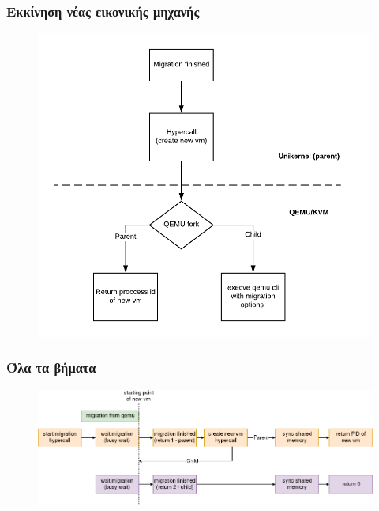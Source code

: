\documentclass[red,slidestop,notes,compress,mathserif]{beamer}
\begin{document}
\begin{frame}
\frametitle{Εκκίνηση νέας εικονικής μηχανής}
\begin{figure}
\center
\includegraphics[scale=0.57]{figures/fork_stage2.png}
\end{figure}
\end{frame}


\begin{frame}
\frametitle{Όλα τα βήματα}
\begin{figure}
\center
\includegraphics[scale=0.36]{figures/fork_timeline_colord.png}
\end{figure}
\end{frame}
\end{document}
